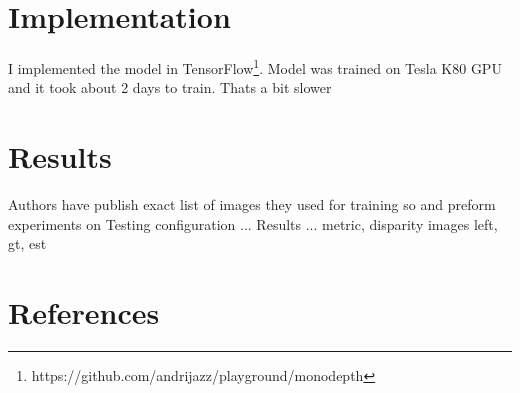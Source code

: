 \documentclass{article}
\begin{document}
\section{Implementation}
   
I implemented the model in TensorFlow\footnote{https://github.com/andrijazz/playground/monodepth}. Model was trained on Tesla K80 GPU and it took about 2 days to train. Thats a bit slower 

\section{Results}
Authors have publish exact list of images they used for training so and preform experiments on Testing configuration ...
Results ... metric, disparity images left, gt, est

\section*{References}

%
%
%
%
%

\end{document}
